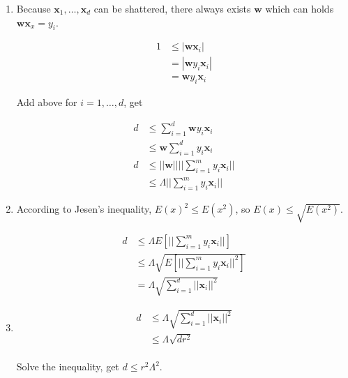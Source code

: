 \documentclass[12pt]{article}
\begin{document}
\begin{enumerate}[label=(\alph*), left=0pt]
    \item 
    Because ${\textbf{x}_{1}, \dots, \textbf{x}_{d}}$ can be shattered, there always exists
    $\mathbf{w}$ which can holds $\mathbf{w}\mathbf{x}_{x}=y_{i}$. 

    \begin{align*}
        1 &\le |\mathbf{w}\mathbf{x}_{i}| \\
        &= |\mathbf{w}y_{i}\mathbf{x}_{i}| \\
        &= \mathbf{w}y_{i}\mathbf{x}_{i}
    \end{align*}

    Add above for $i = 1, \dots, d$, get

    \begin{align*}
        d &\le \sum_{i=1}^{d}\mathbf{w}y_{i}\mathbf{x}_{i} \\
        &\le \mathbf{w}\sum_{i=1}^{d}y_{i}\mathbf{x}_{i} \\
        d &\le ||\mathbf{w}|| ||\sum_{i=1}^{m}y_{i}\mathbf{x}_{i}|| \\
        &\le \Lambda||\sum_{i=1}^{m}y_{i}\mathbf{x}_{i}|| 
    \end{align*}

    \item 
    According to Jesen's inequality, $E(x)^{2} \le E(x^{2})$, so $E(x) \le \sqrt{E(x^{2})}$.

    \begin{align*}
        d &\le \Lambda E[||\sum_{i=1}^{m}y_{i}\mathbf{x}_{i}||] \\
        &\le \Lambda \sqrt{E[||\sum_{i=1}^{m}y_{i}\mathbf{x}_{i}||^{2}]} \\
        &= \Lambda \sqrt{\sum_{i=1}^{d}||\mathbf{x}_{i}||^{2}}
    \end{align*}

    \item 
    \begin{align*}
        d &\le \Lambda \sqrt{\sum_{i=1}^{d}||\mathbf{x}_{i}||^{2}} \\
        &\le \Lambda \sqrt{dr^{2}} \\
    \end{align*}

    Solve the inequality, get $d \le r^{2}\Lambda^{2}$.
\end{enumerate}
\end{document}
